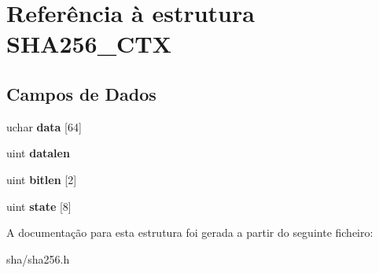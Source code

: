 \hypertarget{structSHA256__CTX}{\section{Referência à estrutura S\+H\+A256\+\_\+\+C\+T\+X}
\label{structSHA256__CTX}
}
\subsection*{Campos de Dados}
\begin{DoxyCompactItemize}
\item 
\hypertarget{structSHA256__CTX_adec0b9fc04b5895620805f316854a397}{uchar {\bfseries data} \mbox{[}64\mbox{]}}\label{structSHA256__CTX_adec0b9fc04b5895620805f316854a397}

\item 
\hypertarget{structSHA256__CTX_aa09dd5a3519b0d43b7e1e2f1805a83d9}{uint {\bfseries datalen}}\label{structSHA256__CTX_aa09dd5a3519b0d43b7e1e2f1805a83d9}

\item 
\hypertarget{structSHA256__CTX_ae2db4026f162364fda80ad8ecfc813bf}{uint {\bfseries bitlen} \mbox{[}2\mbox{]}}\label{structSHA256__CTX_ae2db4026f162364fda80ad8ecfc813bf}

\item 
\hypertarget{structSHA256__CTX_a729a374df6ef3935b080ae8b96605245}{uint {\bfseries state} \mbox{[}8\mbox{]}}\label{structSHA256__CTX_a729a374df6ef3935b080ae8b96605245}

\end{DoxyCompactItemize}


A documentação para esta estrutura foi gerada a partir do seguinte ficheiro\+:\begin{DoxyCompactItemize}
\item 
sha/sha256.\+h\end{DoxyCompactItemize}

